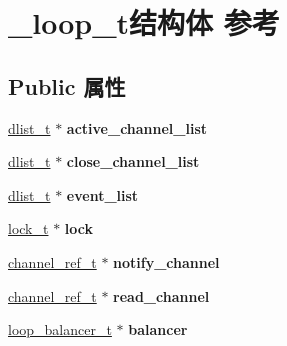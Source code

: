 \hypertarget{struct__loop__t}{}\section{\+\_\+loop\+\_\+t结构体 参考}
\label{struct__loop__t}
\subsection*{Public 属性}
\begin{DoxyCompactItemize}
\item 
\hypertarget{struct__loop__t_a1d4033884e087124aff750c2fa3dd940}{}\hyperlink{struct__dlist__t}{dlist\+\_\+t} $\ast$ {\bfseries active\+\_\+channel\+\_\+list}\label{struct__loop__t_a1d4033884e087124aff750c2fa3dd940}

\item 
\hypertarget{struct__loop__t_a58281719fe93904e20d8cf371cc92916}{}\hyperlink{struct__dlist__t}{dlist\+\_\+t} $\ast$ {\bfseries close\+\_\+channel\+\_\+list}\label{struct__loop__t_a58281719fe93904e20d8cf371cc92916}

\item 
\hypertarget{struct__loop__t_add84738b5cc47a7bd7fda9a538d1a0b3}{}\hyperlink{struct__dlist__t}{dlist\+\_\+t} $\ast$ {\bfseries event\+\_\+list}\label{struct__loop__t_add84738b5cc47a7bd7fda9a538d1a0b3}

\item 
\hypertarget{struct__loop__t_ac70502c67ac58ef57d52fe62039390b7}{}\hyperlink{struct__lock__t}{lock\+\_\+t} $\ast$ {\bfseries lock}\label{struct__loop__t_ac70502c67ac58ef57d52fe62039390b7}

\item 
\hypertarget{struct__loop__t_a90c414783f752525e92edfc76763c44e}{}\hyperlink{struct__channel__ref__t}{channel\+\_\+ref\+\_\+t} $\ast$ {\bfseries notify\+\_\+channel}\label{struct__loop__t_a90c414783f752525e92edfc76763c44e}

\item 
\hypertarget{struct__loop__t_a71352fb022c26178b2777934d9aebdfb}{}\hyperlink{struct__channel__ref__t}{channel\+\_\+ref\+\_\+t} $\ast$ {\bfseries read\+\_\+channel}\label{struct__loop__t_a71352fb022c26178b2777934d9aebdfb}

\item 
\hypertarget{struct__loop__t_a1f91106a5e601739f7cde876de5021f9}{}\hyperlink{struct__loop__balancer__t}{loop\+\_\+balancer\+\_\+t} $\ast$ {\bfseries balancer}\label{struct__loop__t_a1f91106a5e601739f7cde876de5021f9}


\end{DoxyCompactItemize}
